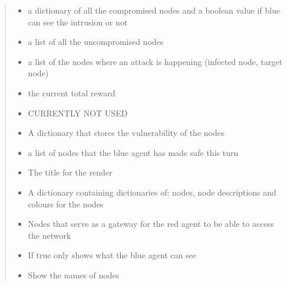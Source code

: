 \documentclass[letterpaper,10pt,english]{sphinxmanual}
\begin{document}
\begin{fulllineitems}
\begin{fulllineitems}
\begin{quote}
\begin{description}
\begin{itemize}
\item {}
\sphinxAtStartPar
{} \textendash{} a dictionary of all the compromised nodes and a boolean value if blue can see the intrusion or not

\item {}
\sphinxAtStartPar
{} \textendash{} a list of all the uncompromised nodes

\item {}
\sphinxAtStartPar
{} \textendash{} a list of the nodes where an attack is happening
(infected node, target node)

\item {}
\sphinxAtStartPar
{} \textendash{} the current total reward

\item {}
\sphinxAtStartPar
{} \textendash{} CURRENTLY NOT USED

\item {}
\sphinxAtStartPar
{} \textendash{} A dictionary that stores the vulnerability of the nodes

\item {}
\sphinxAtStartPar
{} \textendash{} a list of nodes that the blue agent has made safe this turn

\item {}
\sphinxAtStartPar
{} \textendash{} The title for the render

\item {}
\sphinxAtStartPar
{} \textendash{} A dictionary containing dictionaries of: nodes, node descriptions and colours for the nodes

\item {}
\sphinxAtStartPar
{} \textendash{} Nodes that serve as a gateway for the red agent to be able to access the network

\item {}
\sphinxAtStartPar
{} \textendash{} If true only shows what the blue agent can see

\item {}
\sphinxAtStartPar
{} \textendash{} Show the names of nodes

\end{itemize}

\end{description}\end{quote}

\end{fulllineitems}


\end{fulllineitems}
\end{document}
